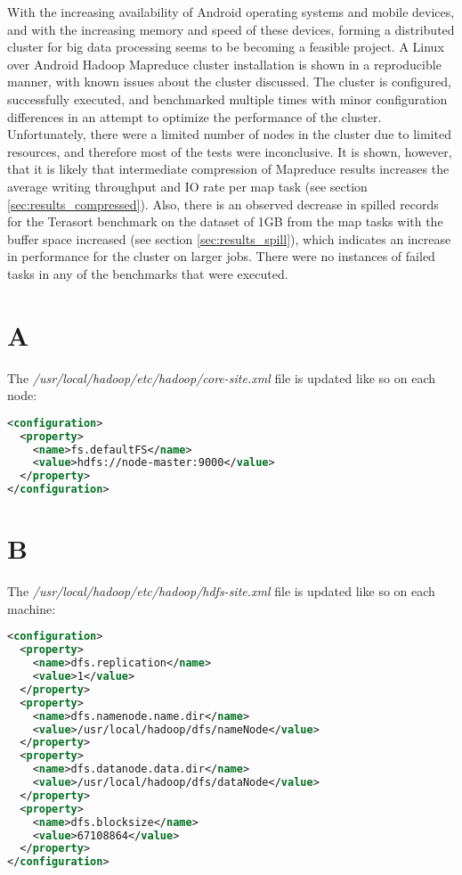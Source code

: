\documentclass[10pt,journal,compsoc,float]{IEEEtran}
\begin{document}
With the increasing availability of Android operating systems and mobile devices, and with the increasing memory and speed of these devices, forming a distributed cluster for big data processing seems to be becoming a feasible project. A Linux over Android Hadoop Mapreduce cluster installation is shown in a reproducible manner, with known issues about the cluster discussed. The cluster is configured, successfully executed, and benchmarked multiple times with minor configuration differences in an attempt to optimize the performance of the cluster. Unfortunately, there were a limited number of nodes in the cluster due to limited resources, and therefore most of the tests were inconclusive. It is shown, however, that it is likely that intermediate compression of Mapreduce results increases the average writing throughput and IO rate per map task (see section \ref{sec:results_compressed}). Also, there is an observed decrease in spilled records for the Terasort benchmark on the dataset of 1GB from the map tasks with the buffer space increased (see section \ref{sec:results_spill}), which indicates an increase in performance for the cluster on larger jobs. There were no instances of failed tasks in any of the benchmarks that were executed.


{}
\textbf{}

\appendix
\section*{A} \label{appendix:core}
The \textit{/usr/local/hadoop/etc/hadoop/core-site.xml} file is updated like so on each node:
\begin{lstlisting}[language=xml]
<configuration>
  <property>
    <name>fs.defaultFS</name>
    <value>hdfs://node-master:9000</value>
  </property>
</configuration>
\end{lstlisting}

\section*{B} \label{appendix:hdfs}
The \textit{/usr/local/hadoop/etc/hadoop/hdfs-site.xml} file is updated like so on each machine:
\begin{lstlisting}[language=xml]
<configuration>
  <property>
    <name>dfs.replication</name>
    <value>1</value>
  </property>
  <property>
    <name>dfs.namenode.name.dir</name>
    <value>/usr/local/hadoop/dfs/nameNode</value>
  </property>
  <property>
    <name>dfs.datanode.data.dir</name>
    <value>/usr/local/hadoop/dfs/dataNode</value>
  </property>
  <property>
    <name>dfs.blocksize</name>
    <value>67108864</value>
  </property>
</configuration>
\end{lstlisting}
\end{document}
